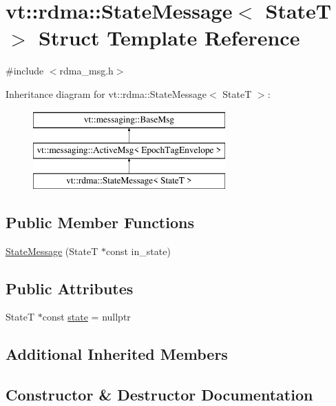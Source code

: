 \hypertarget{structvt_1_1rdma_1_1_state_message}{}\section{vt\+:\+:rdma\+:\+:State\+Message$<$ StateT $>$ Struct Template Reference}
\label{structvt_1_1rdma_1_1_state_message}


{\ttfamily \#include $<$rdma\+\_\+msg.\+h$>$}

Inheritance diagram for vt\+:\+:rdma\+:\+:State\+Message$<$ StateT $>$\+:\begin{figure}[H]
\begin{center}
\leavevmode
\includegraphics[height=3.000000cm]{structvt_1_1rdma_1_1_state_message}
\end{center}
\end{figure}
\subsection*{Public Member Functions}
\begin{DoxyCompactItemize}
\item 
\hyperlink{structvt_1_1rdma_1_1_state_message_a47bf9ada0d80219591d7e9fc0a88e078}{State\+Message} (StateT $\ast$const in\+\_\+state)
\end{DoxyCompactItemize}
\subsection*{Public Attributes}
\begin{DoxyCompactItemize}
\item 
StateT $\ast$const \hyperlink{structvt_1_1rdma_1_1_state_message_a9a80ddef962eae297172e1f269a59b7f}{state} = nullptr
\end{DoxyCompactItemize}
\subsection*{Additional Inherited Members}


\subsection{Constructor \& Destructor Documentation}
\mbox{\label{structvt_1_1rdma_1_1_state_message_a47bf9ada0d80219591d7e9fc0a88e078}} 
